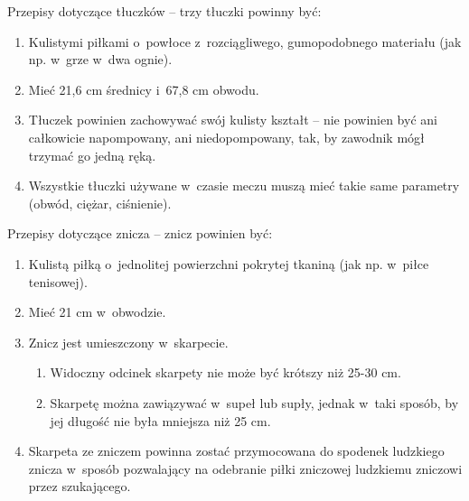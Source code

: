 \documentclass[12pt,a4paper]{article}
\renewcommand{\subsubsection}[1]{
  \oldsubsubsection{#1}%
  \leftskip1.5cm
}
\begin{document}
\subsubsection{Tłuczki}
Przepisy dotyczące tłuczków -- trzy tłuczki powinny być:

\begin{enumerate}
	\item Kulistymi piłkami o~powłoce z~rozciągliwego, gumopodobnego materiału
	      (jak np. w~grze w~dwa ognie).

	\item Mieć 21,6 cm średnicy i~67,8 cm obwodu.

	\item Tłuczek powinien zachowywać swój kulisty kształt -- nie powinien być
	      ani całkowicie napompowany, ani niedopompowany, tak, by zawodnik mógł
	      trzymać go jedną ręką.

	\item Wszystkie tłuczki używane w~czasie meczu muszą mieć takie same
	      parametry (obwód, ciężar, ciśnienie).
\end{enumerate}

\subsubsection{Znicz}
Przepisy dotyczące znicza -- znicz powinien być:

\begin{enumerate}
	\item Kulistą piłką o~jednolitej powierzchni pokrytej tkaniną (jak np. w~piłce tenisowej).

	\item Mieć 21 cm w~obwodzie.

	\item Znicz jest umieszczony w~skarpecie.
	      \begin{enumerate}
		      \item Widoczny odcinek skarpety nie może być krótszy niż 25-30 cm.

		      \item Skarpetę można zawiązywać w~supeł lub supły, jednak w~taki sposób,
		            by jej długość nie była mniejsza niż 25 cm.
	      \end{enumerate}
	\item Skarpeta ze zniczem powinna zostać przymocowana do spodenek ludzkiego
	      znicza w~sposób pozwalający na odebranie piłki zniczowej ludzkiemu
	      zniczowi przez szukającego.
\end{enumerate}
\end{document}
